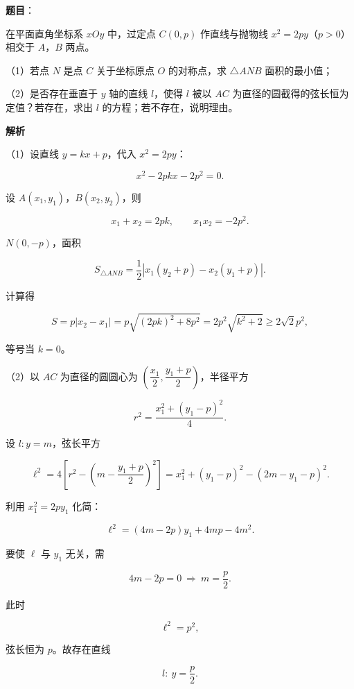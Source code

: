 \begin{answer}

\textbf{题目}：

在平面直角坐标系 $xOy$ 中，过定点 $C(0,p)$ 作直线与抛物线 $x^2=2py$（$p>0$）相交于 $A$，$B$ 两点。

（1）若点 $N$ 是点 $C$ 关于坐标原点 $O$ 的对称点，求 $\triangle ANB$ 面积的最小值；

（2）是否存在垂直于 $y$ 轴的直线 $l$，使得 $l$ 被以 $AC$ 为直径的圆截得的弦长恒为定值？若存在，求出 $l$ 的方程；若不存在，说明理由。
\nopagebreak[4]
\begin{center}\end{center}
\nopagebreak[4]
\textbf{解析}

（1）设直线 $y=kx+p$，代入 $x^2=2py$：

\nopagebreak[4]
\[x^2-2pkx-2p^2=0.\]

设 $A(x_1,y_1)$，$B(x_2,y_2)$，则

\nopagebreak[4]
\[x_1+x_2=2pk,\qquad x_1x_2=-2p^2.\]

$N(0,-p)$，面积

\nopagebreak[4]
\[S_{\triangle ANB}=\frac12|x_1(y_2+p)-x_2(y_1+p)|.\]

计算得

\nopagebreak[4]
\[S=p|x_2-x_1|=p\sqrt{(2pk)^2+8p^2}=2p^2\sqrt{k^2+2}\geqslant2\sqrt2p^2,\]

等号当 $k=0$。

（2）以 $AC$ 为直径的圆圆心为 $\left(\dfrac{x_1}2,\dfrac{y_1+p}2\right)$，半径平方

\nopagebreak[4]
\[r^2=\frac{x_1^2+(y_1-p)^2}{4}.\]

设 $l:y=m$，弦长平方

\nopagebreak[4]
\[\ell^2=4\left[r^2-\left(m-\frac{y_1+p}{2}\right)^2\right]
=x_1^2+(y_1-p)^2-(2m-y_1-p)^2.\]

利用 $x_1^2=2py_1$ 化简：

\nopagebreak[4]
\[\ell^2=(4m-2p)y_1+4mp-4m^2.\]

要使 $\ell$ 与 $y_1$ 无关，需

\nopagebreak[4]
\[4m-2p=0\ \Rightarrow\ m=\frac p2.\]

此时

\nopagebreak[4]
\[\ell^2=p^2,\]

弦长恒为 $p$。故存在直线

\nopagebreak[4]
\[l:\ y=\frac p2.\]


\end{answer}